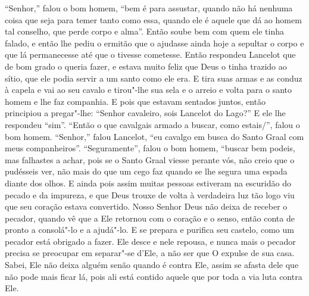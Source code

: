 “Senhor,” falou o bom homem, “bem é para assustar, quando não há nenhuma
coisa que seja para temer tanto como essa, quando ele é aquele que dá ao homem
tal conselho, que perde corpo e alma”. Então soube bem com quem ele
tinha falado, e então lhe pediu o ermitão que o ajudasse ainda hoje a sepultar
o corpo e que lá permanecesse até que o tivesse cometesse. Então respondeu
Lancelot que de bom grado o queria fazer, e estava muito feliz que Deus o
tinha trazido ao sítio, que ele podia servir a um santo como ele era. E tira
suas armas e as conduz à capela e vai ao seu cavalo e tirou"-lhe sua sela e o
arreio e volta para o santo homem e lhe faz companhia. E pois que estavam
sentados juntos, então principiou a pregar"-lhe: “Senhor cavaleiro, sois
Lancelot do Lago?” E ele lhe respondeu “sim”. “Então o que cavalgais armado a
buscar, como estais/”, falou o bom homem. “Senhor,” falou Lancelot, “eu
cavalgo em busca do Santo Graal com meus companheiros”. “Seguramente”, falou o
bom homem, “buscar bem podeis, mas falhastes a achar, pois se o Santo Graal
viesse perante vós, não creio que o pudésseis ver, não mais do que um cego faz
quando se lhe segura uma espada diante dos olhos. E ainda pois assim muitas
pessoas estiveram na escuridão do pecado e da impureza, e que Deus trouxe de
volta à verdadeira luz tão logo viu que seu coração estava convertido. Nosso
Senhor Deus não deixa de receber o pecador, quando vê que a Ele retornou com o
coração e o senso, então conta de pronto a consolá"-lo e a ajudá"-lo. E se
prepara e purifica seu castelo, como um pecador está obrigado a fazer. Ele desce
e nele repousa, e nunca mais o pecador precisa se preocupar em separar"-se
d’Ele, a não ser que O expulse de sua casa. Sabei, Ele não deixa alguém senão
quando é contra Ele, assim se afasta dele que não pode mais ficar lá, pois ali
está contido aquele que por toda a via luta contra Ele.

